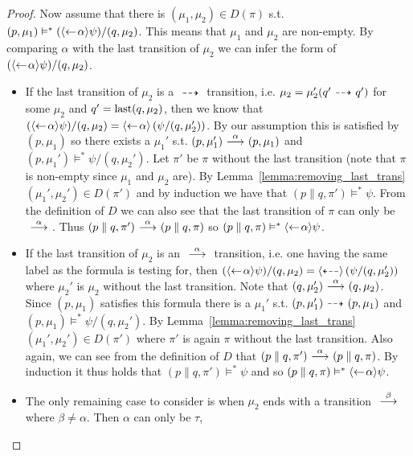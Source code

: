 \begin{proof}
    \rtl Now assume that there is $(\mu_1,\mu_2) \in D(\pi)$ s.t. $(p,\mu_1) \vDash^* (\mbox{\ensuremath{\langle\leftarrow\! 
    \alpha \rangle}}\psi)/(q,\mu_2)$. This means that $\mu_1$ and $\mu_2$ are non-empty. By comparing
    $\alpha$ with the last transition  of $\mu_2$ we can infer the form of $(\mbox{\ensuremath{\langle\leftarrow\! \alpha \rangle}}
    \psi) / (q,\mu_2)$.
    \begin{itemize}
        \item If the last transition of $\mu_2$ is a $\ {\stackrel{_{}}{\dashrightarrow}}\ $ transition, i.e. $\mu_2
            = \mu_2' (q' \ {\stackrel{_{}}{\dashrightarrow}}\  q')$ for some $\mu_2$ and $q' = \operatorname{last}(q,\mu_2)$, then
            we know that $(\mbox{\ensuremath{\langle\leftarrow\! \alpha \rangle}} \psi) / (q,\mu_2) = \mbox{\ensuremath{\langle\leftarrow\! \alpha \rangle}} \left(
            \psi / (q,\mu_2') \right)$. By our assumption this is satisfied by $(p,\mu_1)$
            so there exists a $\mu_1'$ s.t. $(p,\mu_1') \ {\stackrel{{\alpha}}{\longrightarrow}}\  (p,\mu_1)$ and
            $(p,\mu_1') \vDash^* \psi / (q,\mu_2')$. Let $\pi'$ be $\pi$ without the
            last transition (note that $\pi$ is non-empty since $\mu_1$ and $\mu_2$ are).
            By Lemma~\ref{lemma:removing_last_trans} $(\mu_1',\mu_2')\in D(\pi')$ and by
            induction we have that $(p\parallel q,\pi') \vDash^* \psi$. From the definition
            of $D$ we can also see that the last transition of $\pi$ can only be $\ {\stackrel{{\alpha}}{\longrightarrow}}\ $.
            Thus $(p\parallel q,\pi') \ {\stackrel{{\alpha}}{\longrightarrow}}\  (p\parallel q, \pi)$ so $(p\parallel q,\pi)
            \vDash^* \mbox{\ensuremath{\langle\leftarrow\! \alpha \rangle}}\psi$.
        \item If the last transition of $\mu_2$ is an $\ {\stackrel{{\alpha}}{\longrightarrow}}\ $ transition, i.e. one
            having the same label as the formula is testing for, then $(\mbox{\ensuremath{\langle\leftarrow\! \alpha \rangle}}\psi)
            /(q,\mu_2) = \mbox{\ensuremath{\langle\stackrel{_{}}{\dashleftarrow}\rangle}}\left( \psi/(q,\mu_2') \right)$ where $\mu_2'$ is $\mu_2$
            without the last transition. Note that $(q,\mu_2')\ {\stackrel{{\alpha}}{\longrightarrow}}\ (q,\mu_2)$. Since
            $(p,\mu_1)$ satisfies this formula there is a $\mu_1'$ s.t. $(p,\mu_1')\ {\stackrel{_{}}{\dashrightarrow}}\ 
            (p,\mu_1)$ and $(p,\mu_1) \vDash^* \psi/(q,\mu_2')$. By
            Lemma~\ref{lemma:removing_last_trans} $(\mu_1',\mu_2')\in D(\pi')$ where $\pi'$
            is again $\pi$ without the last transition. Also again, we can see from the
            definition of $D$ that $(p\parallel q,\pi')\ {\stackrel{{\alpha}}{\longrightarrow}}\ (p\parallel q,\pi)$.
            By induction it thus holds that \mbox{$(p\parallel q, \pi')\vDash^* \psi$} and so
            $(p\parallel q,\pi) \vDash^* \mbox{\ensuremath{\langle\leftarrow\! \alpha \rangle}}\psi$.
        \item The only remaining case to consider is when $\mu_2$ ends with a transition
            $\ {\stackrel{{\beta}}{\longrightarrow}}\ $ where $\beta \ne \alpha$. Then $\alpha$ can only be $\tau$,

\end{itemize}
\end{proof}
